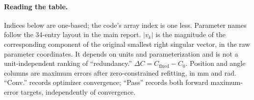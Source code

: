 \documentclass[11pt]{article}
\begin{document}
\paragraph{Reading the table.}
Indices below are one-based; the code's array index is one less. Parameter names follow the 34-entry layout in the main report. $|v_k|$ is the magnitude of the corresponding component of the original smallest right singular vector, in the raw parameter coordinates. It depends on units and parameterization and is not a unit-independent ranking of ``redundancy.'' $\Delta C=C_{\mathrm{fixed}}-C_0$. Position and angle columns are maximum errors after zero-constrained refitting, in mm and rad. ``Conv.'' records optimizer convergence; ``Pass'' records both forward maximum-error targets, independently of convergence.

\begingroup
\setlength{\tabcolsep}{3pt}
\footnotesize
\end{document}
